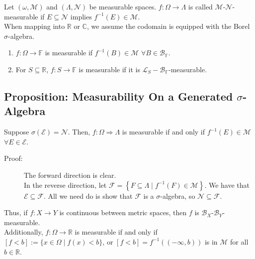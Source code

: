 \documentclass[10pt]{extarticle}
\newcommand{\R}{\mathbb{R}}
\begin{document}
  Let $(\omega,\mathcal{M})$ and $(\Lambda,\mathcal{N})$ be measurable spaces. $f: \Omega \rightarrow \Lambda$ is called $\mathcal{M}$-$\mathcal{N}$-measurable if $E\subseteq \mathcal{N}$ implies $f^{-1}(E)\in \mathcal{M}$.\\

  When mapping into $\R$ or $\mathbb{C}$, we assume the codomain is equipped with the Borel $\sigma$-algebra.
  \begin{enumerate}[(1)]
    \item $f: \Omega \rightarrow \mathbb{F}$ is measurable if $f^{-1}(B) \in \mathcal{M}$ $\forall B\in\mathcal{B}_{\mathbb{F}}$.
    \item For $S\subseteq \R$, $f:S\rightarrow \mathbb{F}$ is measurable if it is $\mathcal{L}_{S}-\mathcal{B}_{\mathbb{F}}$-measurable.
  \end{enumerate}
  \subsection{Proposition: Measurability On a Generated $\sigma$-Algebra}%
  Suppose $\sigma(\mathcal{E}) = \mathcal{N}$. Then, $f:\Omega\Rightarrow \mathcal{\Lambda}$ is measurable if and only if $f^{-1}(E)\in \mathcal{M}$ $\forall E\in \mathcal{E}$.
  \begin{description}
    \item[Proof:] The forward direction is clear.\\

      In the reverse direction, let $\mathcal{F} = \left\{F\subseteq \Lambda \mid f^{-1}(F)\in \mathcal{M}\right\}$. We have that $\mathcal{E}\subseteq \mathcal{F}$. All we need do is show that $\mathcal{F}$ is a $\sigma$-algebra, so $\mathcal{N}\subseteq \mathcal{F}$.
  \end{description}
  Thus, if $f: X\rightarrow Y$ is continuous between metric spaces, then $f$ is $\mathcal{B}_{X}$-$\mathcal{B}_{Y}$-measurable.\\

  Additionally, $f: \Omega \rightarrow \R$ is measurable if and only if $[f < b] := \{x\in \Omega\mid f(x) < b\}$, or $[f < b] = f^{-1}\left((-\infty,b)\right)$ is in $\mathcal{M}$ for all $b\in \R$.
\end{document}
